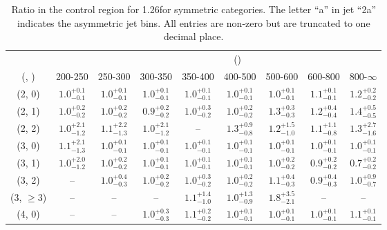 \begin{table}[h!]
\tiny
\centering
\caption{Ratio in the \mj control region for 1.26\ifb for symmetric categories. The letter ``a'' in jet \eg ``2a''  indicates the asymmetric jet bins. All entries are non-zero but are truncated to one decimal place.\label{tab:ratiosep_mu_ewk_sym}}
\begin{tabular}
{ccccccccc}
	\hline\hline
&	& \multicolumn{8}{c}{\scalht (\gev)} \\ 
	 (\njet,  \nb) & 200-250 & 250-300 & 300-350 & 350-400 & 400-500 & 500-600 & 600-800 & 800-$\infty$ \\ [0.8ex] 
\hline
	(2, 0) & $1.0^{+ 0.1 }_{- 0.1 }$ & $1.0^{+ 0.1 }_{- 0.1 }$ & $1.0^{+ 0.1 }_{- 0.1 }$ & $1.0^{+ 0.1 }_{- 0.1 }$ & $1.0^{+ 0.1 }_{- 0.1 }$ & $1.0^{+ 0.1 }_{- 0.1 }$ & $1.1^{+ 0.1 }_{- 0.1 }$ & $1.2^{+ 0.2 }_{- 0.2 }$ \\[0.5ex] 
	(2, 1) & $1.0^{+ 0.2 }_{- 0.2 }$ & $1.0^{+ 0.2 }_{- 0.2 }$ & $0.9^{+ 0.2 }_{- 0.2 }$ & $1.0^{+ 0.3 }_{- 0.2 }$ & $1.0^{+ 0.2 }_{- 0.2 }$ & $1.3^{+ 0.3 }_{- 0.3 }$ & $1.2^{+ 0.4 }_{- 0.4 }$ & $1.4^{+ 0.5 }_{- 0.5 }$ \\[0.5ex] 
	(2, 2) & $1.0^{+ 2.1 }_{- 1.2 }$ & $1.1^{+ 2.2 }_{- 1.3 }$ & $1.0^{+ 2.1 }_{- 1.2 }$ & -- & $1.3^{+ 0.9 }_{- 0.8 }$ & $1.2^{+ 1.5 }_{- 1.0 }$ & $1.1^{+ 1.1 }_{- 0.8 }$ & $1.3^{+ 2.7 }_{- 1.6 }$ \\[0.5ex] 
	(3, 0) & $1.1^{+ 2.1 }_{- 1.3 }$ & $1.0^{+ 0.1 }_{- 0.1 }$ & $1.0^{+ 0.1 }_{- 0.1 }$ & $1.0^{+ 0.1 }_{- 0.1 }$ & $1.0^{+ 0.1 }_{- 0.1 }$ & $1.0^{+ 0.1 }_{- 0.1 }$ & $1.0^{+ 0.1 }_{- 0.1 }$ & $1.0^{+ 0.1 }_{- 0.1 }$ \\[0.5ex] 
	(3, 1) & $1.0^{+ 2.0 }_{- 1.2 }$ & $1.0^{+ 0.2 }_{- 0.2 }$ & $1.0^{+ 0.1 }_{- 0.1 }$ & $1.0^{+ 0.1 }_{- 0.1 }$ & $1.0^{+ 0.1 }_{- 0.1 }$ & $1.0^{+ 0.2 }_{- 0.2 }$ & $0.9^{+ 0.2 }_{- 0.2 }$ & $0.7^{+ 0.2 }_{- 0.2 }$ \\[0.5ex] 
	(3, 2) & -- & $1.0^{+ 0.4 }_{- 0.3 }$ & $1.0^{+ 0.2 }_{- 0.2 }$ & $1.0^{+ 0.3 }_{- 0.2 }$ & $1.0^{+ 0.2 }_{- 0.2 }$ & $1.1^{+ 0.4 }_{- 0.3 }$ & $0.9^{+ 0.4 }_{- 0.3 }$ & $1.0^{+ 0.9 }_{- 0.7 }$ \\[0.5ex] 
	(3, $\ge3$) & -- & -- & -- & $1.1^{+ 1.4 }_{- 1.0 }$ & $1.0^{+ 1.3 }_{- 0.9 }$ & $1.8^{+ 3.5 }_{- 2.1 }$ & -- & -- \\[0.5ex] 
	(4, 0) & -- & -- & $1.0^{+ 0.3 }_{- 0.3 }$ & $1.1^{+ 0.2 }_{- 0.2 }$ & $1.0^{+ 0.1 }_{- 0.1 }$ & $1.0^{+ 0.1 }_{- 0.1 }$ & $1.0^{+ 0.1 }_{- 0.1 }$ & $1.1^{+ 0.1 }_{- 0.1 }$ \\[0.5ex] 

\end{tabular}
\end{table}
